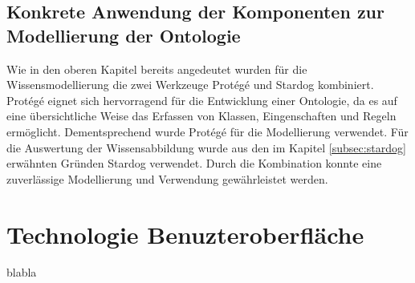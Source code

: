 \subsection{Konkrete Anwendung der Komponenten zur Modellierung der Ontologie}
\label{subsec:komponenten_anwendung}
Wie in den oberen Kapitel bereits angedeutet wurden für die Wissensmodellierung die zwei Werkzeuge Protégé und Stardog kombiniert. Protégé eignet sich hervorragend für die Entwicklung einer Ontologie, da es auf eine übersichtliche Weise das Erfassen von Klassen, Eingenschaften und Regeln ermöglicht. Dementsprechend wurde Protégé für die Modellierung verwendet.
Für die Auswertung der Wissensabbildung wurde aus den im Kapitel \ref{subsec:stardog} erwähnten Gründen Stardog verwendet. Durch die Kombination konnte eine zuverlässige Modellierung und Verwendung gewährleistet werden. 


\section{Technologie Benuzteroberfläche}
\label{sec:komponenten_ember}
blabla

